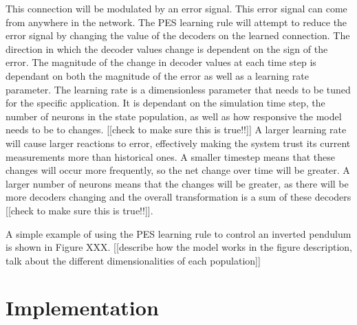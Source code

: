 \documentclass[letterpaper,12pt,titlepage,oneside,final]{book}
\begin{document}
This connection will be modulated by an error signal. 
This error signal can come from anywhere in the network. 
The PES learning rule will attempt to reduce the error signal by changing the value of the decoders on the learned connection. 
The direction in which the decoder values change is dependent on the sign of the error. 
The magnitude of the change in decoder values at each time step is dependant on both the magnitude of the error as well as a learning rate parameter. 
The learning rate is a dimensionless parameter that needs to be tuned for the specific application. 
It is dependant on the simulation time step, the number of neurons in the state population, as well as how responsive the model needs to be to changes. [[check to make sure this is true!!]] 
A larger learning rate will cause larger reactions to error, effectively making the system trust its current measurements more than historical ones. 
A smaller timestep means that these changes will occur more frequently, so the net change over time will be greater. 
A larger number of neurons means that the changes will be greater, as there will be more decoders changing and the overall transformation is a sum of these decoders [[check to make sure this is true!!]].

A simple example of using the PES learning rule to control an inverted pendulum is shown in Figure XXX. [[describe how the model works in the figure description, talk about the different dimensionalities of each population]]





\chapter{Implementation} \label{chap:implementation}
\end{document}
